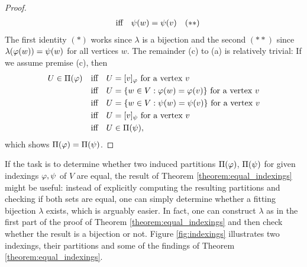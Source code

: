 \begin{proof}
\begin{align*}
        &\quad\text{iff}\quad \psi(w) = \psi(v) &(**)
    \end{align*}
    The first identity $(*)$ works since $\lambda$ is a bijection and the second $(**)$ since $\lambda(\varphi(w))=\psi(w)$ for all vertices $w$.
    The remainder (c) to (a) is relatively trivial: If we assume premise (c), then
    \begin{align*}
        U \in \Pi(\varphi) &\quad\text{iff}\quad U = [v]_\varphi \text{ for a vertex $v$} \\
        &\quad\text{iff}\quad U = \{ w \in V : \varphi(w) = \varphi(v) \} \text{ for a vertex $v$} \\
        &\quad\text{iff}\quad U = \{ w \in V : \psi(w) = \psi(v) \} \text{ for a vertex $v$} \\ 
        &\quad\text{iff}\quad U = [v]_{\psi} \text{ for a vertex $v$} \\
        &\quad\text{iff}\quad U \in \Pi(\psi),
    \end{align*}
    which shows $\Pi(\varphi)=\Pi(\psi)$.
\end{proof}

If the task is to determine whether two induced partitions $\Pi(\varphi)$, $\Pi(\psi)$ for given indexings $\varphi,\psi$ of $V$ are equal, the result of Theorem \ref{theorem:equal_indexings} might be useful: instead of explicitly computing the resulting partitions and checking if both sets are equal, one can simply determine whether a fitting bijection $\lambda$ exists, which is arguably easier. In fact, one can construct $\lambda$ as in the first part of the proof of Theorem \ref{theorem:equal_indexings} and then check whether the result is a bijection or not. Figure \ref{fig:indexings} illustrates two indexings, their partitions and some of the findings of Theorem \ref{theorem:equal_indexings}.